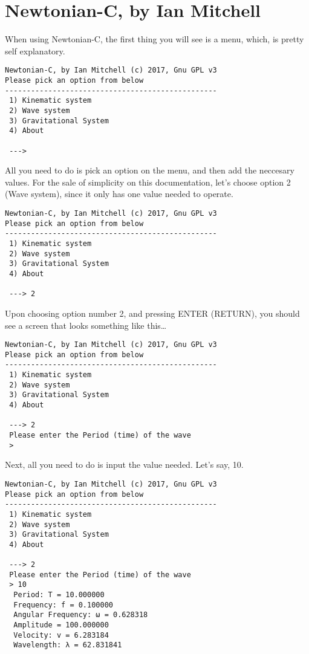 \documentclass[]{article}
\date{}
\begin{document}
\section{Newtonian-C, by Ian
Mitchell}\label{newtonian-c-by-ian-mitchell}

When using Newtonian-C, the first thing you will see is a menu, which,
is pretty self explanatory.

\begin{verbatim}
Newtonian-C, by Ian Mitchell (c) 2017, Gnu GPL v3
Please pick an option from below 
-------------------------------------------------
 1) Kinematic system
 2) Wave system
 3) Gravitational System
 4) About

 --->
\end{verbatim}

All you need to do is pick an option on the menu, and then add the
neccesary values. For the sale of simplicity on this documentation,
let's choose option 2 (Wave system), since it only has one value needed
to operate.

\begin{verbatim}
Newtonian-C, by Ian Mitchell (c) 2017, Gnu GPL v3
Please pick an option from below 
-------------------------------------------------
 1) Kinematic system
 2) Wave system
 3) Gravitational System
 4) About

 ---> 2
\end{verbatim}

Upon choosing option number 2, and pressing ENTER (RETURN), you should
see a screen that looks something like this\ldots{}

\begin{verbatim}
Newtonian-C, by Ian Mitchell (c) 2017, Gnu GPL v3
Please pick an option from below 
-------------------------------------------------
 1) Kinematic system
 2) Wave system
 3) Gravitational System
 4) About

 ---> 2
 Please enter the Period (time) of the wave  
 >
\end{verbatim}

Next, all you need to do is input the value needed. Let's say, 10.

\begin{verbatim}
Newtonian-C, by Ian Mitchell (c) 2017, Gnu GPL v3
Please pick an option from below 
-------------------------------------------------
 1) Kinematic system
 2) Wave system
 3) Gravitational System
 4) About

 ---> 2
 Please enter the Period (time) of the wave  
 > 10
  Period: T = 10.000000                     
  Frequency: f = 0.100000                       
  Angular Frequency: ω = 0.628318                   
  Amplitude = 100.000000                        
  Velocity: v = 6.283184                        
  Wavelength: λ = 62.831841
\end{verbatim}
\end{document}
